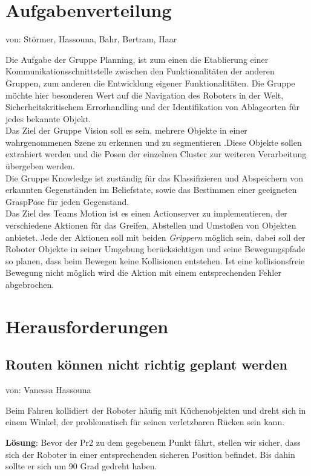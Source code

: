 \documentclass{suturo}
\makeatletter
\newcommand{\chapterauthor}[1]{%
  {\parindent0pt\vspace*{-27pt}%
  \linespread{0}\small\begin{flushright}von: #1\end{flushright}%
  \par\nobreak\vspace*{0pt}}
  \@afterheading%
}
\makeatother
\begin{document}
\section{Aufgabenverteilung}
\chapterauthor{Störmer, Hassouna, Bahr, Bertram, Haar}
Die Aufgabe der Gruppe Planning, ist zum einen die Etablierung einer Kommunikationsschnittstelle zwischen den Funktionalitäten der anderen Gruppen, zum anderen die Entwicklung eigener Funktionalitäten. Die Gruppe möchte hier besonderen Wert auf die Navigation des Roboters in der Welt, Sicherheitskritischem Errorhandling und der Identifikation von Ablageorten für jedes bekannte Objekt. \\

Das Ziel der Gruppe Vision soll es sein, mehrere Objekte in einer wahrgenommenen Szene zu erkennen und zu segmentieren .Diese Objekte sollen extrahiert werden und die Posen der einzelnen Cluster zur weiteren Verarbeitung übergeben werden. \\

Die Gruppe Knowledge ist zuständig für das Klassifizieren und Abspeichern von erkannten Gegenständen im Beliefstate, sowie das Bestimmen einer geeigneten GraspPose für jeden Gegenstand.\\

Das Ziel des Teams Motion ist es einen Actionserver zu implementieren, der verschiedene Aktionen für das Greifen, Abstellen und Umstoßen von Objekten anbietet. Jede der Aktionen soll mit beiden \textit{Grippern} möglich sein, dabei soll der Roboter Objekte in seiner Umgebung berücksichtigen und seine Bewegungspfade so planen, dass beim Bewegen keine Kollisionen entstehen. Ist eine kollisionsfreie Bewegung nicht möglich wird die Aktion mit einem entsprechenden Fehler abgebrochen.\\

\section{Herausforderungen}
\subsection{Routen können nicht richtig geplant werden}
\chapterauthor{Vanessa Hassouna}
Beim Fahren kollidiert der Roboter häufig mit Küchenobjekten und dreht sich in einem Winkel, der problematisch für seinen verletzbaren Rücken sein kann.

\textbf{Lösung}: Bevor der Pr2 zu dem gegebenem Punkt fährt, stellen wir sicher, dass sich der Roboter in einer entsprechenden sicheren Position befindet. Bis dahin sollte er sich um 90 Grad gedreht haben.
\end{document}
